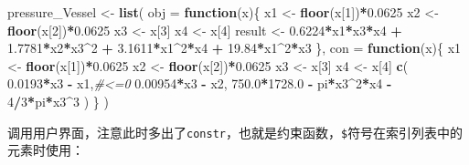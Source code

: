 \documentclass[]{ctexbook}
\newenvironment{Shaded}{\begin{snugshade}}{\end{snugshade}}
\newcommand{\KeywordTok}[1]{\textcolor[rgb]{0.13,0.29,0.53}{\textbf{#1}}}
\newcommand{\DataTypeTok}[1]{\textcolor[rgb]{0.13,0.29,0.53}{#1}}
\newcommand{\DecValTok}[1]{\textcolor[rgb]{0.00,0.00,0.81}{#1}}
\newcommand{\FloatTok}[1]{\textcolor[rgb]{0.00,0.00,0.81}{#1}}
\newcommand{\StringTok}[1]{\textcolor[rgb]{0.31,0.60,0.02}{#1}}
\newcommand{\CommentTok}[1]{\textcolor[rgb]{0.56,0.35,0.01}{\textit{#1}}}
\newcommand{\ControlFlowTok}[1]{\textcolor[rgb]{0.13,0.29,0.53}{\textbf{#1}}}
\newcommand{\OperatorTok}[1]{\textcolor[rgb]{0.81,0.36,0.00}{\textbf{#1}}}
\newcommand{\NormalTok}[1]{#1}
\begin{document}
\begin{Shaded}
\begin{Highlighting}[]
\NormalTok{pressure_Vessel <-}\StringTok{ }\KeywordTok{list}\NormalTok{(}
  \DataTypeTok{obj =} \ControlFlowTok{function}\NormalTok{(x)\{}
\NormalTok{    x1 <-}\StringTok{ }\KeywordTok{floor}\NormalTok{(x[}\DecValTok{1}\NormalTok{])}\OperatorTok{*}\FloatTok{0.0625}
\NormalTok{    x2 <-}\StringTok{ }\KeywordTok{floor}\NormalTok{(x[}\DecValTok{2}\NormalTok{])}\OperatorTok{*}\FloatTok{0.0625}
\NormalTok{    x3 <-}\StringTok{ }\NormalTok{x[}\DecValTok{3}\NormalTok{]}
\NormalTok{    x4 <-}\StringTok{ }\NormalTok{x[}\DecValTok{4}\NormalTok{]}
\NormalTok{    result <-}\StringTok{ }\FloatTok{0.6224}\OperatorTok{*}\NormalTok{x1}\OperatorTok{*}\NormalTok{x3}\OperatorTok{*}\NormalTok{x4 }\OperatorTok{+}\StringTok{ }
\StringTok{      }\FloatTok{1.7781}\OperatorTok{*}\NormalTok{x2}\OperatorTok{*}\NormalTok{x3}\OperatorTok{^}\DecValTok{2} \OperatorTok{+}
\StringTok{      }\FloatTok{3.1611}\OperatorTok{*}\NormalTok{x1}\OperatorTok{^}\DecValTok{2}\OperatorTok{*}\NormalTok{x4 }\OperatorTok{+}\StringTok{ }
\StringTok{      }\FloatTok{19.84}\OperatorTok{*}\NormalTok{x1}\OperatorTok{^}\DecValTok{2}\OperatorTok{*}\NormalTok{x3}
\NormalTok{  \},}
  \DataTypeTok{con =} \ControlFlowTok{function}\NormalTok{(x)\{}
\NormalTok{    x1 <-}\StringTok{ }\KeywordTok{floor}\NormalTok{(x[}\DecValTok{1}\NormalTok{])}\OperatorTok{*}\FloatTok{0.0625}
\NormalTok{    x2 <-}\StringTok{ }\KeywordTok{floor}\NormalTok{(x[}\DecValTok{2}\NormalTok{])}\OperatorTok{*}\FloatTok{0.0625}
\NormalTok{    x3 <-}\StringTok{ }\NormalTok{x[}\DecValTok{3}\NormalTok{]}
\NormalTok{    x4 <-}\StringTok{ }\NormalTok{x[}\DecValTok{4}\NormalTok{]}
    \KeywordTok{c}\NormalTok{(}
      \FloatTok{0.0193}\OperatorTok{*}\NormalTok{x3 }\OperatorTok{-}\StringTok{ }\NormalTok{x1,}\CommentTok{#<=0}
      \FloatTok{0.00954}\OperatorTok{*}\NormalTok{x3 }\OperatorTok{-}\StringTok{ }\NormalTok{x2,}
      \FloatTok{750.0}\OperatorTok{*}\FloatTok{1728.0} \OperatorTok{-}\StringTok{ }\NormalTok{pi}\OperatorTok{*}\NormalTok{x3}\OperatorTok{^}\DecValTok{2}\OperatorTok{*}\NormalTok{x4 }\OperatorTok{-}\StringTok{ }\DecValTok{4}\OperatorTok{/}\DecValTok{3}\OperatorTok{*}\NormalTok{pi}\OperatorTok{*}\NormalTok{x3}\OperatorTok{^}\DecValTok{3}
\NormalTok{    )}
\NormalTok{  \}}
\NormalTok{)}
\end{Highlighting}
\end{Shaded}

调用用户界面，注意此时多出了\texttt{constr}，也就是约束函数，\texttt{\$}符号在索引列表中的元素时使用：
\end{document}
